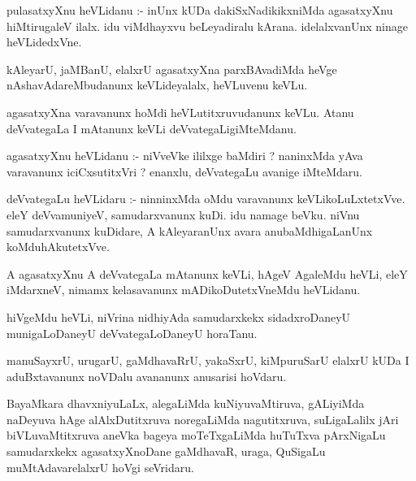 \documentclass{article}
\begin{document}
\begin{mn}
pulasatxyXnu  heVLidanu :- inUnx  kUDa  dakiSxNadikikxniMda  agasatxyXnu  hiMtirugaleV  
ilalx.  idu  viMdhayxvu  beLeyadiralu  kArana.  idelalxvanUnx  ninage  heVLidedxVne.
\end{mn}

\begin{mn}
kAleyarU,  jaMBanU,  elalxrU  agasatxyXna  parxBAvadiMda  heVge  nAshavAdareMbudanunx  
keVLideyalalx,  heVLuvenu  keVLu.
\end{mn}

\begin{mn}
agasatxyXna  varavanunx  hoMdi  heVLutitxruvudanunx  keVLu.  Atanu  deVvategaLa  
I  mAtanunx  keVLi  deVvategaLigiMteMdanu.
\end{mn}

\begin{mn}
agasatxyXnu  heVLidanu :- niVveVke  ililxge  baMdiri ?  naninxMda  yAva  varavanunx  
iciCxsutitxVri ?  enanxlu,  deVvategaLu  avanige  iMteMdaru.
\end{mn}

\begin{mn}
deVvategaLu   heVLidaru :- ninninxMda  oMdu  varavanunx  keVLikoLuLxtetxVve.  eleY  
deVvamuniyeV,  samudarxvanunx  kuDi.  idu  namage  beVku.  niVnu  samudarxvanunx  
kuDidare,  A  kAleyaranUnx  avara  anubaMdhigaLanUnx  koMduhAkutetxVve.
\end{mn}

\begin{mn}
A  agasatxyXnu  A  deVvategaLa  mAtanunx  keVLi,  hAgeV  AgaleMdu  heVLi,  
eleY  iMdarxneV,  nimamx  kelasavanunx  mADikoDutetxVneMdu  heVLidanu.
\end{mn}

\begin{mn}
hiVgeMdu  heVLi,  niVrina  nidhiyAda  samudarxkekx  sidadxroDaneyU  
munigaLoDaneyU  deVvategaLoDaneyU  horaTanu.
\end{mn}

\begin{mn}
manuSayxrU,  urugarU,  gaMdhavaRrU,  yakaSxrU,  kiMpuruSarU  elalxrU  kUDa  
I  aduBxtavanunx  noVDalu  avananunx  anusarisi  hoVdaru.
\end{mn}

\begin{mn}
BayaMkara  dhavxniyuLaLx,  alegaLiMda  kuNiyuvaMtiruva,  gALiyiMda  naDeyuva  
hAge  alAlxDutitxruva  noregaLiMda  nagutitxruva,  suLigaLalilx  jAri  
biVLuvaMtitxruva  aneVka bageya  moTeTxgaLiMda  huTuTxva  pArxNigaLu  samudarxkekx  
agasatxyXnoDane  gaMdhavaR,  uraga,  QuSigaLu  muMtAdavarelalxrU  hoVgi  seVridaru.
\end{mn}
\end{document}
